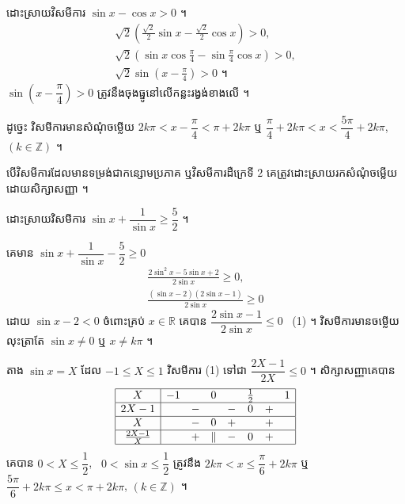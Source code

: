 \begin{example}[ឧទាហរណ៍ ១]
ដោះស្រាយវិសមីការ $\sin x - \cos x > 0$ ។
\[
\begin{gathered}
\sqrt{2}\left(\frac{\sqrt{2}}{2}\sin x - \frac{\sqrt{2}}{2}\cos x\right) > 0,\\
\sqrt{2}\left(\sin x\cos\frac{\pi}{4} - \sin\frac{\pi}{4}\cos x\right) > 0,\\
\sqrt{2}\sin\left(x - \frac{\pi}{4}\right) > 0 \text{ ។}
\end{gathered}
\]
$\sin\left(x - \dfrac{\pi}{4}\right) > 0$ ត្រូវនឹងចុងធ្នូនៅលើកន្លះរង្វង់ខាងលើ ។

ដូច្នេះ វិសមីការមានសំណុំចម្លើយ $2k\pi < x - \dfrac{\pi}{4} < \pi + 2k\pi$ ឬ $\dfrac{\pi}{4} + 2k\pi < x < \dfrac{5\pi}{4} + 2k\pi$, $(k \in \mathbb{Z})$ ។
\end{example}

\begin{note}[សម្គាល់]
បើវិសមីការដែលមានទម្រង់ជាកន្សោមប្រភាគ ឬវិសមីការដឺក្រេទី $2$ គេត្រូវដោះស្រាយរកសំណុំចម្លើយដោយសិក្សាសញ្ញា ។
\end{note}

\begin{example}[ឧទាហរណ៍ ២]
ដោះស្រាយវិសមីការ $\sin x + \dfrac{1}{\sin x} \ge \dfrac{5}{2}$ ។

គេមាន $\sin x + \dfrac{1}{\sin x} - \dfrac{5}{2} \ge 0$
\[
\begin{gathered}
\frac{2\sin^2 x - 5\sin x + 2}{2\sin x} \ge 0,\\
\frac{(\sin x - 2)(2\sin x - 1)}{2\sin x} \ge 0
\end{gathered}
\]
ដោយ $\sin x - 2 < 0$ ចំពោះគ្រប់ $x \in \mathbb{R}$ គេបាន $\dfrac{2\sin x - 1}{2\sin x} \le 0$ \ (1) ។ វិសមីការមានចម្លើយលុះត្រាតែ $\sin x \ne 0$ ឬ $x \ne k\pi$ ។

តាង $\sin x = X$ ដែល $-1 \le X \le 1$ វិសមីការ (1) ទៅជា $\dfrac{2X - 1}{2X} \le 0$ ។ សិក្សាសញ្ញាគេបាន
\[
\begin{array}{|c|ccccccc|}\hline
X & -1 & & 0 & & \frac{1}{2} & & 1\\ \hline
2X - 1 & & - & & - & 0 & + & \\ \hline
X & & - & 0 & + & & + & \\ \hline
\frac{2X - 1}{X} & & + & \| & - & 0 & + & \\ \hline
\end{array}
\]
គេបាន $0 < X \le \dfrac{1}{2}$, \ $0 < \sin x \le \dfrac{1}{2}$ ត្រូវនឹង $2k\pi < x \le \dfrac{\pi}{6} + 2k\pi$ ឬ $\dfrac{5\pi}{6} + 2k\pi \le x < \pi + 2k\pi$, $(k \in \mathbb{Z})$ ។
\end{example}

